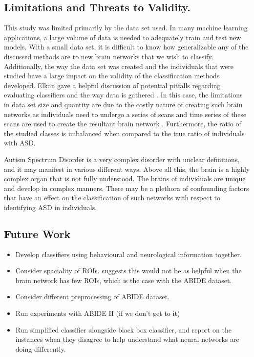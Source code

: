 \documentclass[sigconf]{acmart}
\begin{document}
\subsection{Limitations and Threats to Validity.}
This study was limited primarily by the data set used.
In many machine learning applications, a large volume of data is needed to adequately train and test new models.
With a small data set, it is difficult to know how generalizable any of the discussed methods are to new brain networks that we wish to classify.
Additionally, the way the data set was created and the individuals that were studied have a large impact on the validity of the classification methods developed.
Elkan gave a helpful discussion of potential pitfalls regarding evaluating classifiers and the way data is gathered \cite{elkan2012}.
In this case, the limitations in data set size and quantity are due to the costly nature of creating such brain networks as individuals need to undergo a series of scans and time series of these scans are used to create the resultant brain network \cite{lanciano2020}.
Furthermore, the ratio of the studied classes is imbalanced when compared to the true ratio of individuals with ASD.

Autism Spectrum Disorder is a very complex disorder with unclear definitions, and it may manifest in various different ways.
Above all this, the brain is a highly complex organ that is not fully understood.
The brains of individuals are unique and develop in complex manners.
There may be a plethora of confounding factors that have an effect on the classification of such networks with respect to identifying ASD in individuals.



\subsection{Future Work} \label{future work}
\begin{itemize}
    \item Develop classifiers using behavioural and neurological information together.
    \item Consider spaciality of ROIs. \cite{relion2019} suggests this would not be as helpful when the brain network has few ROIs, which is the case with the ABIDE dataset.
    \item Consider different preprocessing of ABIDE dataset.
    \item Run experiments with ABIDE II (if we don't get to it)
    \item Run simplified classifier alongside black box classifier, and report on the instances when they disagree to help understand what neural networks are doing differently.
\end{itemize}
\end{document}
